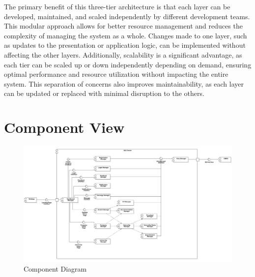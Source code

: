The primary benefit of this three-tier architecture is that each layer can be developed, maintained, and scaled independently by different development teams. This modular approach allows for better resource management and reduces the complexity of managing the system as a whole. Changes made to one layer, such as updates to the presentation or application logic, can be implemented without affecting the other layers. Additionally, scalability is a significant advantage, as each tier can be scaled up or down independently depending on demand, ensuring optimal performance and resource utilization without impacting the entire system. This separation of concerns also improves maintainability, as each layer can be updated or replaced with minimal disruption to the others.

\section{Component View}

\begin{figure}[H]
    \centering
    \includegraphics[width=1\linewidth]{DD/Images/component_diagram.png}
    \caption{Component Diagram}
    \label{fig:enter-label}
\end{figure}

